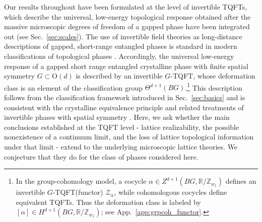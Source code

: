\documentclass[aps,prx,reprint,superscriptaddress,twocolumn,amsmath,amssymb,amsfonts, nofootinbib]{revtex4-2}
\theoremstyle{apsstyle}
\begin{document}
Our results throughout have been formulated at the level of invertible TQFTs, which  describe the universal, low-energy topological response obtained after the massive microscopic degrees of freedom of a gapped phase have been integrated out (see Sec.~\ref{sec:scales}). The use of invertible field theories as long-distance descriptions of gapped, short-range entangled phases is standard in modern classifications of topological phases \cite{Freed2014,Freed2021,FreedHopkins}. 
Accordingly, the universal low-energy response of a gapped short range entangled crystalline phase with finite spatial symmetry $G\subset\mathrm{O}(d)$ is described by an invertible $G$-TQFT, whose deformation class is an element of the classification group $\Theta^{d+1}(BG)$.\footnote{In the group-cohomology model, a cocycle
$\alpha\in Z^{d+1}(BG,\mathbb R/\mathbb Z_{w_1})$ defines an
invertible $G$-TQFT(functor) $\mathcal Z_\alpha$, while cohomologous cocycles define equivalent TQFTs. Thus the deformation class is labeled by $[\alpha]\in H^{d+1}(BG,\mathbb R/\mathbb Z_{w_1})$; see App.~\ref{app:grpcoh_functor}.} This description follows from the classification framework introduced in Sec.~\ref{sec:basics} and is consistent with the crystalline equivalence principle and related treatments of invertible phases with spatial symmetry \cite{ThorngrenElse,FreedHopkins}. Here, we ask whether the main conclusions established at the TQFT level - lattice realizability, the possible nonexistence of a continuum limit, and the loss of lattice topological information under that limit - extend to the underlying microscopic lattice theories. We conjecture that they do for the class of phases considered here.


\bigskip
\end{document}
